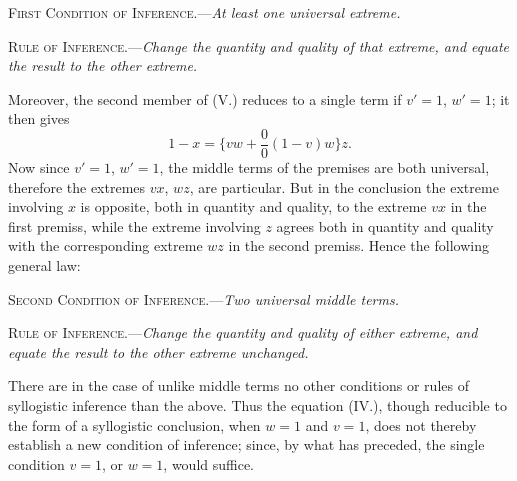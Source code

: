 \documentclass[oneside]{book}
\begin{document}
\textsc{First Condition of Inference.}---\emph{At least one universal
extreme.}

\textsc{Rule of Inference.}---\emph{Change the quantity and quality of
that extreme, and equate the result to the other extreme.}

Moreover, the second member of (V.) reduces to a single term
if $v' = 1$, $w' = 1$; it then gives
\[
  1-x = \{vw + \frac{0}{0}(1-v)w\} z.
\]
Now since $v' = 1$, $w' = 1$, the middle terms of the premises are
both universal, therefore the extremes $vx$, $wz$, are particular.
But in the conclusion the extreme involving $x$ is opposite, both
in quantity and quality, to the extreme $vx$ in the first premiss,
while the extreme involving $z$ agrees both in quantity and quality with the corresponding extreme $wz$ in the second premiss.
Hence the following general law:

\textsc{Second Condition of Inference.}---\emph{Two universal middle
terms.}

\textsc{Rule of Inference.}---\emph{Change the quantity and quality of
either extreme, and equate the result to the other extreme unchanged.}

There are in the case of unlike middle terms no other conditions or rules of syllogistic inference than the above. Thus the
equation (IV.), though reducible to the form of a syllogistic conclusion, when $w=1$ and $v = 1$, does not thereby establish a new
condition of inference; since, by what has preceded, the single
condition $v = 1$, or $w = 1$, would suffice.
\end{document}
